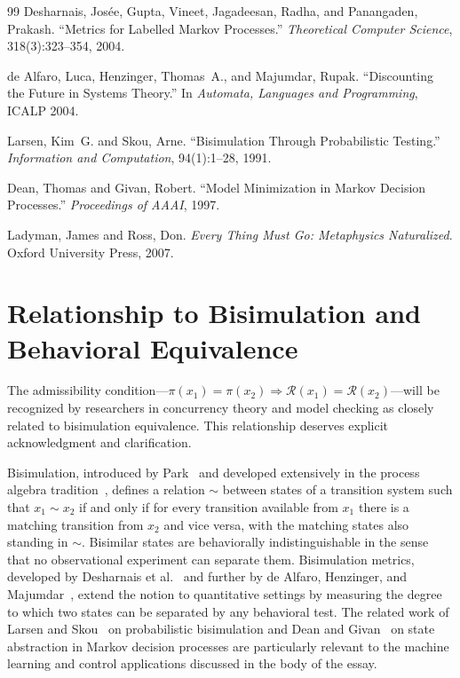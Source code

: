 \documentclass[12pt,a4paper]{article}
\theoremstyle{plain}
\theoremstyle{definition}
\theoremstyle{remark}
\begin{document}
\begin{thebibliography}{99}
Desharnais, Jos\'{e}e, Gupta, Vineet, Jagadeesan, Radha, and Panangaden,
Prakash.
``Metrics for Labelled Markov Processes.''
\textit{Theoretical Computer Science}, 318(3):323--354, 2004.

de Alfaro, Luca, Henzinger, Thomas~A., and Majumdar, Rupak.
``Discounting the Future in Systems Theory.''
In \textit{Automata, Languages and Programming}, ICALP 2004.

Larsen, Kim~G. and Skou, Arne.
``Bisimulation Through Probabilistic Testing.''
\textit{Information and Computation}, 94(1):1--28, 1991.

Dean, Thomas and Givan, Robert.
``Model Minimization in Markov Decision Processes.''
\textit{Proceedings of AAAI}, 1997.

Ladyman, James and Ross, Don.
\textit{Every Thing Must Go: Metaphysics Naturalized}.
Oxford University Press, 2007.

\end{thebibliography}

\section{Relationship to Bisimulation and Behavioral Equivalence}

The admissibility condition---$\pi(x_1) = \pi(x_2) \Rightarrow
\mathcal{R}(x_1) = \mathcal{R}(x_2)$---will be recognized by researchers in
concurrency theory and model checking as closely related to bisimulation
equivalence. This relationship deserves explicit acknowledgment and
clarification.

Bisimulation, introduced by Park~\cite{park1981} and developed extensively
in the process algebra tradition~\cite{milner1989}, defines a relation $\sim$
between states of a transition system such that $x_1 \sim x_2$ if and only if
for every transition available from $x_1$ there is a matching transition from
$x_2$ and vice versa, with the matching states also standing in $\sim$.
Bisimilar states are behaviorally indistinguishable in the sense that no
observational experiment can separate them. Bisimulation metrics, developed
by Desharnais et al.~\cite{desharnais2004} and further by de Alfaro,
Henzinger, and Majumdar~\cite{dealfaro2004}, extend the notion to quantitative
settings by measuring the degree to which two states can be separated by any
behavioral test. The related work of Larsen and Skou~\cite{larsen1991} on
probabilistic bisimulation and Dean and Givan~\cite{dean1997} on state
abstraction in Markov decision processes are particularly relevant to the
machine learning and control applications discussed in the body of the essay.
\end{document}
